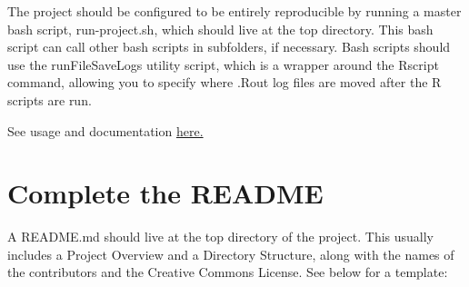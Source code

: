 \documentclass[]{book}
\begin{document}
The project should be configured to be entirely reproducible by running
a master bash script, run-project.sh, which should live at the top
directory. This bash script can call other bash scripts in subfolders,
if necessary. Bash scripts should use the runFileSaveLogs utility
script, which is a wrapper around the Rscript command, allowing you to
specify where .Rout log files are moved after the R scripts are run.

See usage and documentation
\href{https://jadebc.github.io/lab-manual/unix.html\#example-code-for-runfilesavelogs}{here.}

\hypertarget{complete-the-readme}{\section{Complete the
README}\label{complete-the-readme}}

A README.md should live at the top directory of the project. This
usually includes a Project Overview and a Directory Structure, along
with the names of the contributors and the Creative Commons License. See
below for a template:
\end{document}

